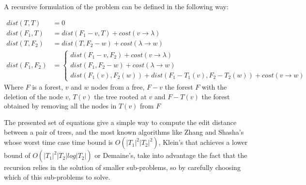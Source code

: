 A recursive formulation of the problem can be defined in the following way:

\begin{align*}
dist(T,T) &= 0 \\
dist(F_1, T) &= dist(F_1 - v, T) + cost(v \rightarrow \lambda) \\
dist(T, F_2) &= dist(T, F_2 - w) + cost(\lambda \rightarrow w) \\
dist(F_1, F_2)&=\left\{
\begin{array}{ll}
dist(F_1 - v, F_2) + cost(v \rightarrow \lambda) \\
dist(F_1, F_2 - w) + cost(\lambda \rightarrow w) \\
dist(F_1(v), F_2(w)) + dist(F_1 - T_1(v), F_2 - T_2(w)) + cost(v \rightarrow w)
\end{array}
\right.
\end{align*}  
Where $F$ is a forest, $v$ and $w$ nodes from a free, $F - v$ the forest $F$ with the deletion of the node $v$, $T(v)$  the tree rooted at $v$ and $F-T(v)$ the forest obtained by removing all the nodes in $T(v)$ from $F$	

The presented set of equations give a simple way to compute the edit distance between a pair of trees, and the most known algorithms like Zhang and Shasha's\cite{zhang_shasha} whose worst time case time bound is $O(|T_1|^2|T_2|^2)$, Klein's\cite{klein} that achieves a lower bound of $O(|T_1|^2|T_2|log|T_2|)$ or Demaine's\cite{demaine}, take into advantage the fact that the recursion relies in the solution of smaller sub-problems, so by carefully choosing which of this sub-problems to solve.


\thispagestyle{empty}



